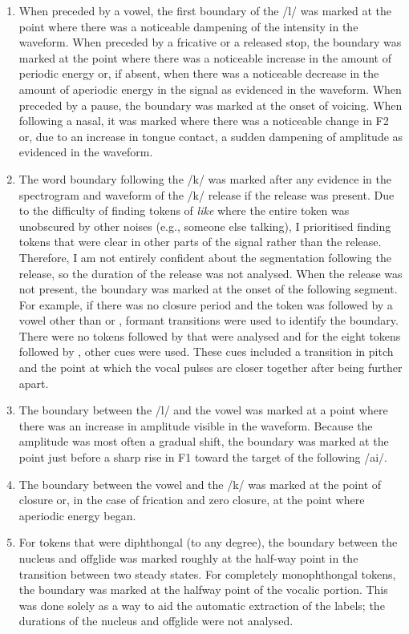 \begin{enumerate}
	\item When preceded by a vowel, the first boundary of the /l/ was marked at the point where there was a noticeable dampening of the intensity in the waveform. When preceded by a fricative or a released stop, the boundary was marked at the point where there was a noticeable increase in the amount of periodic energy or, if absent, when there was a noticeable decrease in the amount of aperiodic energy in the signal as evidenced in the waveform. When preceded by a pause, the boundary was marked at the onset of voicing. When following a nasal, it was marked where there was a noticeable change in F2 or, due to an increase in tongue contact, a sudden dampening of amplitude as evidenced in the waveform.
\largerpage
	\item The word boundary following the /k/ was marked after any evidence in the spectrogram and waveform of the /k/ release if the release was present. Due to the difficulty of finding tokens of \textit{like} where the entire token was unobscured by other noises (e.g., someone else talking), I prioritised finding tokens that were clear in other parts of the signal rather than the release. Therefore, I am not entirely confident about the segmentation following the release, so the duration of the release was not analysed. When the release was not present, the boundary was marked at the onset of the following segment. For example, if there was no closure period and the token was followed by a vowel other than  or , formant transitions were used to identify the boundary. There were no tokens followed by  that were analysed and for the eight tokens followed by , other cues were used. These cues included a transition in pitch and the point at which the vocal pulses are closer together after being further apart.
	\item The boundary between the /l/ and the vowel was marked at a point where there was an increase in amplitude visible in the waveform. Because the amplitude was most often a gradual shift, the boundary was marked at the point just before a sharp rise in F1 toward the target of the following /ai/.
	\item The boundary between the vowel and the /k/ was marked at the point of closure or, in the case of frication and zero closure, at the point where aperiodic energy began.
	\item For tokens that were diphthongal (to any degree), the boundary between the nucleus and offglide was marked roughly at the half-way point in the transition between two steady states. For completely monophthongal tokens, the boundary was marked at the halfway point of the vocalic portion. This was done solely as a way to aid the automatic extraction of the labels; the durations of the nucleus and offglide were not analysed.
	
\end{enumerate}

